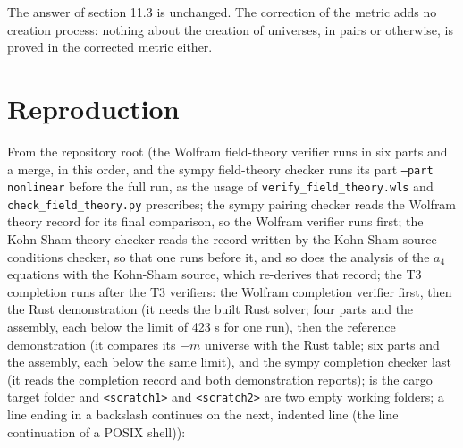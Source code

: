 \documentclass[11pt]{article}
\begin{document}
The answer of section 11.3 is unchanged. The correction of the metric adds no creation process: nothing about the creation of universes, in pairs or otherwise, is proved in the corrected metric either.

\section{Reproduction}

From the repository root (the Wolfram field-theory verifier runs in six parts and a merge, in this order, and the sympy field-theory checker runs its part \texttt{--part n\allowbreak{}onlinear} before the full run, as the usage of \texttt{verify\_f\allowbreak{}ield\_the\allowbreak{}ory.wls} and \texttt{check\_fi\allowbreak{}eld\_theo\allowbreak{}ry.py} prescribes; the sympy pairing checker reads the Wolfram theory record for its final comparison, so the Wolfram verifier runs first; the Kohn-Sham theory checker reads the record written by the Kohn-Sham source-conditions checker, so that one runs before it, and so does the analysis of the $a_4$ equations with the Kohn-Sham source, which re-derives that record; the T3 completion runs after the T3 verifiers: the Wolfram completion verifier first, then the Rust demonstration (it needs the built Rust solver; four parts and the assembly, each below the limit of 423 s for one run), then the reference demonstration (it compares its $-m$ universe with the Rust table; six parts and the assembly, each below the same limit), and the sympy completion checker last (it reads the completion record and both demonstration reports); \texttt{} is the cargo target folder and \texttt{<scratch\allowbreak{}1>} and \texttt{<scratch\allowbreak{}2>} are two empty working folders; a line ending in a backslash continues on the next, indented line (the line continuation of a POSIX shell)):
\end{document}
